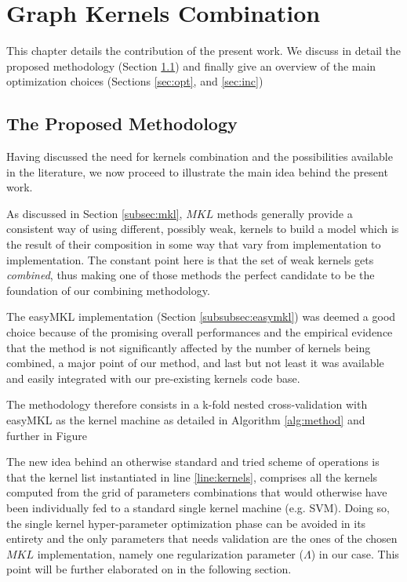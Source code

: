 \chapter{Graph Kernels Combination}
\label{Chapter3}

This chapter details the contribution of the present work.
We discuss in detail the proposed methodology (Section \ref{sec:meth}) and
finally give an overview of the main optimization choices (Sections
\ref{sec:opt}, and \ref{sec:inc})

\section{The Proposed Methodology}
\label{sec:meth}

Having discussed the need for kernels combination and the possibilities available
in the literature, we now proceed to illustrate the main idea behind the present
work.

As discussed in Section \ref{subsec:mkl}, $MKL$ methods generally provide a consistent
way of using different, possibly weak, kernels to build a model which is the result
of their composition in some way that vary from implementation to implementation.
The constant point here is that the set of weak kernels gets \emph{combined}, thus
making one of those methods the perfect candidate to be the foundation of our
combining methodology.

The easyMKL implementation (Section \ref{subsubsec:easymkl}) was deemed a good
choice because of the promising overall performances and the empirical evidence
that the method is not significantly affected by the number of kernels
being combined, a major point of our method, and last but not least it was
available and easily integrated with our pre-existing kernels code base.

The methodology therefore consists in a k-fold nested cross-validation with
easyMKL as the kernel machine as detailed in Algorithm \ref{alg:method} and further in
Figure %

The new idea behind an otherwise standard and tried scheme of operations is that
the kernel list instantiated in line \ref{line:kernels}, comprises all the 
kernels computed from the grid of parameters combinations that would otherwise
have been individually fed to a standard single kernel machine (e.g. SVM).
Doing so, the single kernel hyper-parameter optimization phase can be avoided in its
entirety and the only parameters that needs validation are the ones of the chosen
$MKL$ implementation, namely one regularization parameter ($\Lambda$) in our case.
This point will be further elaborated on in the following section.

